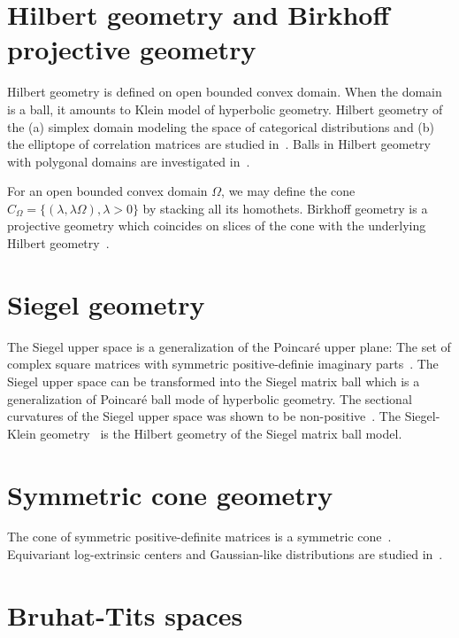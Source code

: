 \documentclass[11pt]{article}
\begin{document}
\section*{Hilbert geometry and Birkhoff projective geometry}

Hilbert geometry is defined on open bounded convex domain. When the domain is a ball, it amounts to Klein model of hyperbolic geometry.
Hilbert geometry of the (a) simplex domain modeling the space of categorical distributions and (b) the elliptope of correlation matrices are studied in~\cite{nielsen2019clustering,nielsen2023non}. 
Balls in Hilbert geometry with polygonal domains are investigated in~\cite{nielsen2017balls}.

For an open bounded convex domain $\Omega$, we may define the cone $C_\Omega=\{(\lambda,\lambda\Omega), \lambda>0\}$ by stacking all its homothets. Birkhoff geometry is a projective geometry which coincides on slices of the cone with the underlying Hilbert geometry~\cite{nielsen2023fisher}.


 
\section*{Siegel geometry}

The Siegel upper space is a generalization of the Poincar\'e upper plane: The set of complex square matrices with symmetric positive-definie imaginary parts~\cite{nielsen2013matrix}. The Siegel upper space can be transformed into the Siegel matrix ball which is a generalization of Poincar\'e ball mode of hyperbolic geometry.
The sectional curvatures of the Siegel upper space was shown to be non-positive~\cite{cabanes2021classification}.
The Siegel-Klein geometry~\cite{nielsen2020siegel} is the Hilbert geometry of the Siegel matrix ball model.

\section*{Symmetric cone geometry}

The cone of symmetric positive-definite matrices is a symmetric cone~\cite{nielsen2023fisher}.
Equivariant log-extrinsic centers and Gaussian-like distributions are studied in~\cite{chevallier2024equivariant}.


\section*{Bruhat-Tits spaces}
\end{document}
